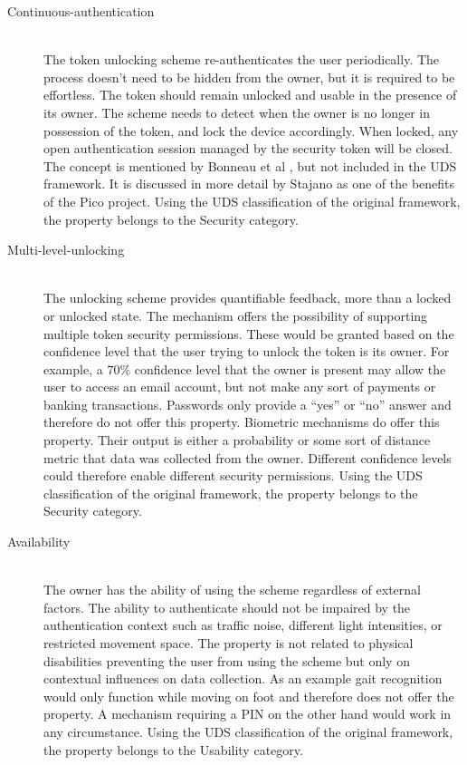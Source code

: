 \begin{description}
  \item[Continuous-authentication] \hfill \\
  The token unlocking scheme re-authenticates the user periodically. The process doesn't need to be hidden from the owner, but it is required to be effortless. The token should remain unlocked and usable in the presence of its owner. The scheme needs to detect when the owner is no longer in possession of the token, and lock the device accordingly. When locked, any open authentication session managed by the security token will be closed. The concept is mentioned by Bonneau et al \cite{bonneau2012quest}, but not included in the UDS framework. It is discussed in more detail by Stajano \cite{stajano2011pico} as one of the benefits of the Pico project. Using the UDS classification of the original framework, the property belongs to the Security category.
  
  \item[Multi-level-unlocking] \hfill \\
  The unlocking scheme provides quantifiable feedback, more than a locked or unlocked state. The mechanism offers the possibility of supporting multiple token security permissions. These would be granted based on the confidence level that the user trying to unlock the token is its owner. For example, a $70\%$ confidence level that the owner is present may allow the user to access an email account, but not make any sort of payments or banking transactions. Passwords only provide a ``yes'' or ``no'' answer and therefore do not offer this property. Biometric mechanisms do offer this property. Their output is either a probability or some sort of distance metric that data was collected from the owner. Different confidence levels could therefore enable different security permissions. Using the UDS classification of the original framework, the property belongs to the Security category.
  
  \item[Availability] \hfill \\
  The owner has the ability of using the scheme regardless of external factors. The ability to authenticate should not be impaired by the authentication context such as traffic noise, different light intensities, or restricted movement space. The property is not related to physical disabilities preventing the user from using the scheme but only on contextual influences on data collection. As an example gait recognition would only function while moving on foot and therefore does not offer the property. A mechanism requiring a PIN on the other hand would work in any circumstance. Using the UDS classification of the original framework, the property belongs to the Usability category.
  
\end{description}

